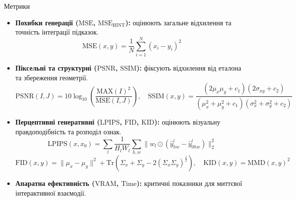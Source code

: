 \begin{frame}{Метрики}
    \footnotesize

    \begin{itemize}
        \item \textbf{Похибки генерації ($\mathrm{MSE}$, $\mathrm{MSE}_{\mathrm{HINT}}$):} оцінюють загальне відхилення та точність інтеграції підказок.
        \begin{equation*}
            \mathrm{MSE} \left( x, y \right) = \frac{1}{N} \sum_{i=1}^N (x_i - y_i)^2
        \end{equation*}

        \item \textbf{Піксельні та структурні ($\mathrm{PSNR}$, $\mathrm{SSIM}$):} фіксують відхилення від еталона та збереження геометрії.
        \begin{equation*}
            \mathrm{PSNR} \left( I, J \right) = 10 \log_{10} \left( \frac{{\mathrm{MAX} \left( I \right)}^2}{\mathrm{MSE} \left( I, J \right)} \right), \quad \mathrm{SSIM} \left( x, y \right) = \frac{(2\mu_x\mu_y + c_1)(2\sigma_{xy} + c_2)}{(\mu_x^2 + \mu_y^2 + c_1)(\sigma_x^2 + \sigma_y^2 + c_2)}
        \end{equation*}

        \item \textbf{Перцептивні генеративні ($\mathrm{LPIPS}$, $\mathrm{FID}$, $\mathrm{KID}$):} оцінюють візуальну правдоподібність та розподіл ознак.
        \begin{equation*}
            \mathrm{LPIPS}(x, x_0) = \sum_l \frac{1}{H_l W_l} \sum_{h,w} \| w_l \odot (\hat{y}^l_{hw} - \hat{y}^l_{0hw}) \|_2^2
        \end{equation*}
        \begin{equation*}
            \mathrm{FID} \left( x, y \right) = \|\mu_x - \mu_y\|^2 + \mathrm{Tr}\left(\Sigma_x + \Sigma_y - 2(\Sigma_x \Sigma_y)^{\frac{1}{2}}\right), \quad \mathrm{KID} \left( x, y \right) = {\mathrm{MMD} \left( x, y \right)}^2
        \end{equation*}

        \item \textbf{Апаратна ефективність ($\mathrm{VRAM}$, $\mathrm{Time}$):} критичні показники для миттєвої інтерактивної взаємодії.
    \end{itemize}
\end{frame}